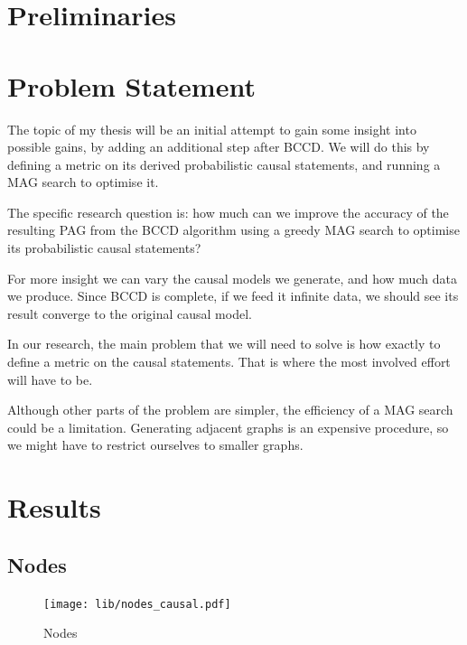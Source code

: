 \documentclass[11pt,a4paper]{report}
\begin{document}
\chapter{Preliminaries}\label{preliminaries}

\chapter{Problem Statement}\label{problem}
The topic of my thesis will be an initial attempt to gain some insight
into possible gains, by adding an additional step after BCCD. We will do
this by defining a metric on its derived probabilistic causal statements,
and running a MAG search to optimise it.

The specific research question is: how much can we improve the accuracy of
the resulting PAG from the BCCD algorithm using a greedy MAG search
to optimise its probabilistic causal statements?

For more insight we can vary the causal models we generate, and how much
data we produce. Since BCCD is complete, if we feed it infinite data, we
should see its result converge to the original causal model.

In our research, the main problem that we will need to solve is how
exactly to define a metric on the causal statements. That is where the most
involved effort will have to be.

Although other parts of the problem are simpler, the efficiency of a MAG
search could be a limitation. Generating adjacent graphs is an
expensive procedure, so we might have to restrict ourselves to smaller
graphs.


\chapter{Results}\label{results}

\section{Nodes}
\begin{figure}
  \centering
  \texttt{[image: lib/nodes\_causal.pdf]}
  \caption{Nodes}
  \label{nodes_causal}
\end{figure}
\end{document}
